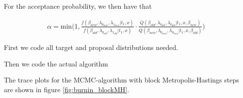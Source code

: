 
For the acceptance probability, we then have that 

\begin{align}
    \alpha = \text{min} \Bigg(1,  \frac{
    f(\beta_{new}, \lambda_{0_{new}}, \lambda_{1_{new}}|t_1, x)}{f(\beta_{old}, \lambda_{0_{old}}, \lambda_{1_{old}}|t_1, x)}
    \cdot 
    \frac{Q(\beta_{old}, \lambda_{0_{old}}, \lambda_{0_{old}} | t_1, x, \beta_{new})}{Q(\beta_{new}, \lambda_{0_{new}}, \lambda_{0_{new}} | t_1, x, \beta_{old})} \Bigg) %
\end{align}




First we code all target and proposal distributions needed.


Then we code the actual algorithm


The trace plots for the MCMC-algorithm with block Metropolis-Hastings steps are shown in figure \ref{fig:burnin_blockMH}. 

